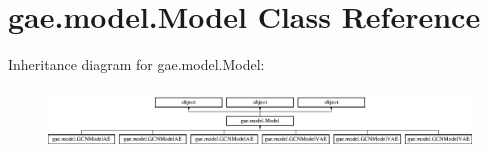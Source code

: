 \hypertarget{classgae_1_1model_1_1Model}{}\section{gae.\+model.\+Model Class Reference}
\label{classgae_1_1model_1_1Model}
Inheritance diagram for gae.\+model.\+Model\+:\begin{figure}[H]
\begin{center}
\leavevmode
\includegraphics[height=1.647059cm]{classgae_1_1model_1_1Model}
\end{center}
\end{figure}
